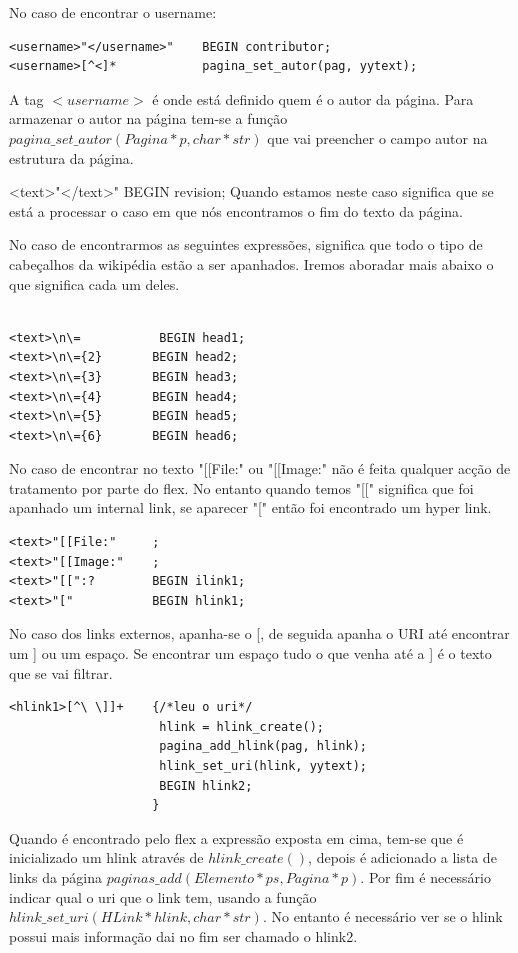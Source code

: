 \documentclass[11pt, a4paper, oneside]{article}
\begin{document}
No caso de encontrar o  username:
\begin{verbatim}
<username>"</username>"    BEGIN contributor;
<username>[^<]*            pagina_set_autor(pag, yytext);
\end{verbatim}
A tag \begin{math}<username>\end{math} é onde está definido quem é o autor da página. Para armazenar o autor na página tem-se a função\begin{math}pagina\_set\_autor(Pagina* p, char* str)\end{math} que vai preencher o campo autor na estrutura da página.

<text>"</text>"     BEGIN revision;
Quando estamos neste caso significa que se está a processar o caso em que nós encontramos o fim do texto da página.


No caso de encontrarmos as seguintes expressões, significa que todo o tipo de cabeçalhos da wikipédia estão a ser apanhados. Iremos aboradar mais abaixo o que significa cada um deles.
\begin{verbatim}

<text>\n\=           BEGIN head1;
<text>\n\={2}       BEGIN head2;
<text>\n\={3}       BEGIN head3;
<text>\n\={4}       BEGIN head4;
<text>\n\={5}       BEGIN head5;
<text>\n\={6}       BEGIN head6;
\end{verbatim}

No caso de encontrar no texto "[[File:" ou "[[Image:" não é feita qualquer acção de tratamento por parte do flex. No entanto quando temos "[[" significa que foi apanhado um internal link, se aparecer "[" então foi encontrado um hyper link.

\begin{verbatim}
<text>"[[File:"     ;
<text>"[[Image:"    ;
<text>"[[":?        BEGIN ilink1;
<text>"["           BEGIN hlink1;
\end{verbatim}

No caso dos links externos, apanha-se o [, de seguida apanha o URI até encontrar um ] ou um espaço. Se encontrar um espaço tudo o que venha até a ]  é o texto que se vai filtrar.
\begin{verbatim}
<hlink1>[^\ \]]+    {/*leu o uri*/
                     hlink = hlink_create();
                     pagina_add_hlink(pag, hlink);
                     hlink_set_uri(hlink, yytext);
                     BEGIN hlink2;
                    }
\end{verbatim}

Quando é  encontrado pelo flex a expressão exposta em cima, tem-se que é inicializado um hlink através de \begin{math} hlink\_create() \end{math}, depois é adicionado a lista de links da página  \begin{math} paginas\_add(Elemento* ps, Pagina* p)\end{math}. Por fim  é necessário indicar qual o uri que o link tem, usando a função  \begin{math} hlink\_set\_uri(HLink* hlink, char* str)\end{math}.
No entanto é necessário ver se o hlink possui mais informação dai no fim ser chamado o hlink2.
\end{document}
